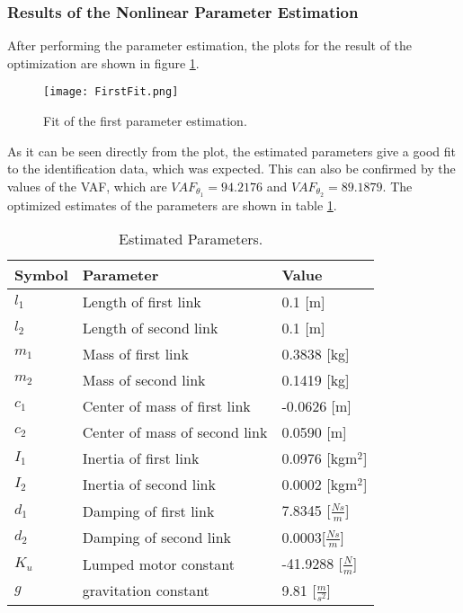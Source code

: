 \documentclass[main.tex]{subfiles}
\begin{document}
\subsubsection{Results of the Nonlinear Parameter Estimation}

After performing the parameter estimation, the plots for the result of the optimization are shown in figure \ref{fig:FirstFit}.

\begin{figure}[H]
\centering
\texttt{[image: FirstFit.png]}
\caption{\label{fig:FirstFit} Fit of the first parameter estimation.}
\end{figure}

As it can be seen directly from the plot, the estimated parameters give a good fit to the identification data, which was expected. This can also be confirmed by the values of the VAF, which are $VAF_{\theta_1}=94.2176$ and $VAF_{\theta_2}=89.1879$. The optimized estimates of the parameters are shown in table \ref{tab:estimatedparam}.

\begin{table}[H]
\caption{Estimated Parameters.}
\centering
\begin{tabular}{|l|l|l|}
\hline
Symbol &Parameter &Value \\ \hline
$l_1$ &Length of first link &0.1 [m] \\ 
$l_2$ &Length of second link &0.1 [m]\\ 
$m_1$ &Mass of first link &0.3838 [kg]\\ 
$m_2$ &Mass of second link &0.1419 [kg]\\ 
$c_1$ &Center of mass of first link &-0.0626 [m]\\ 
$c_2$ &Center of mass of second link &0.0590 [m]\\ 
$I_1$ &Inertia of first link &0.0976 [kgm$^2$]\\ 
$I_2$ &Inertia of second link &0.0002 [kgm$^2$]\\
$d_1$ &Damping of first link &7.8345 [$\frac{Ns}{m}$]\\
$d_2$ &Damping of second link &0.0003[$\frac{Ns}{m}$]\\
$K_u$ &Lumped motor constant &-41.9288 [$\frac{N}{m}$]\\
$g$ & gravitation constant & 9.81 [$\frac{m}{s^2}$]\\ \hline
\end{tabular}
\label{tab:estimatedparam}
\end{table} 
\end{document}
